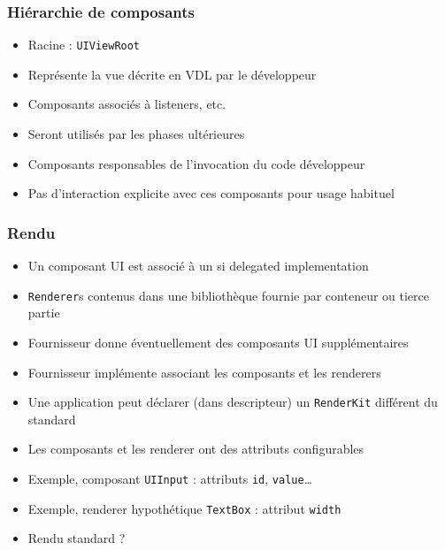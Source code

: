 \documentclass[english, french]{beamer}
\begin{document}
\begin{frame}
	\frametitle{Hiérarchie de composants}
	\begin{itemize}
		\item Racine : \texttt{UIViewRoot}
		\item Représente la vue décrite en VDL par le développeur
		\item Composants associés à listeners, etc.
		\item Seront utilisés par les phases ultérieures
		\item Composants responsables de l’invocation du code développeur
		\item Pas d’interaction explicite avec ces composants {\tiny pour usage habituel}
	\end{itemize}
\end{frame}

\begin{frame}
	\frametitle{Rendu}
	\begin{itemize}
		\item Un composant UI est associé à un  {\tiny si delegated implementation}
		\item \texttt{Renderer}s contenus dans une bibliothèque fournie par conteneur ou tierce partie
		\item Fournisseur donne éventuellement des composants UI supplémentaires 
		\item Fournisseur implémente  associant les composants et les renderers
		\item Une application peut déclarer (dans descripteur) un \texttt{RenderKit} différent du standard
		\item Les composants et les renderer ont des attributs configurables
		\item Exemple, composant \texttt{UIInput} : attributs \texttt{id}, \texttt{value}…
		\item Exemple, renderer {\tiny hypothétique} \texttt{TextBox} : attribut \texttt{width}
		\item Rendu standard ?
	\end{itemize}
\end{frame}
\end{document}
